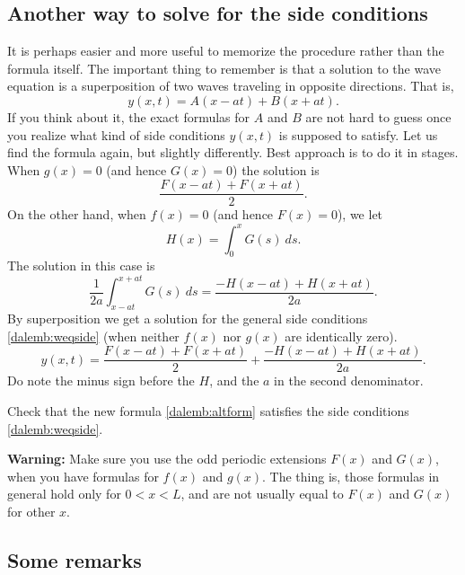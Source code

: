 \subsection{Another way to solve for the side conditions}

It is perhaps easier and more useful
to memorize the procedure rather than the formula
itself.  The important thing to remember is that a solution to the wave
equation is a superposition of two waves traveling in opposite directions.
That is,
\begin{equation*}
y(x,t) = A(x-at) + B(x+at) .
\end{equation*}
If you think about it, the exact formulas for $A$ and $B$ are not hard
to guess once you realize what kind of side conditions $y(x,t)$ is supposed to
satisfy.  Let us find the formula again, but slightly differently.
Best approach is to do it in stages.  When $g(x) = 0$ (and hence
$G(x) = 0$) the solution is
\begin{equation*}
\frac{ F(x-at) + F(x+at) }{2} .
\end{equation*}
On the other hand,
when $f(x) = 0$ (and hence $F(x) = 0$), we let
\begin{equation*}
H(x) = \int_0^x G(s) ~ds .
\end{equation*}
The solution in this case is
\begin{equation*}
\frac{1}{2a} \int_{x-at}^{x+at} G(s) ~ds
=
\frac{ -H(x-at) + H(x+at) }{2a} .
\end{equation*}
By superposition we get a solution for the general side conditions
\eqref{dalemb:weqside} (when neither $f(x)$ nor $g(x)$ are identically zero).
\begin{equation} \label{dalemb:altform}
y(x,t) = \frac{ F(x-at) + F(x+at) }{2} +
\frac{ -H(x-at) + H(x+at) }{2a} .
\end{equation}
Do note the minus sign before the $H$, and the $a$ in the second denominator.

\begin{exercise}
Check that the new formula \eqref{dalemb:altform} satisfies
the side conditions
\eqref{dalemb:weqside}.
\end{exercise}

\textbf{Warning:}
Make sure you use the odd periodic extensions $F(x)$ and $G(x)$,
when you have formulas for $f(x)$ and $g(x)$.
The thing is, those formulas in general hold
only for $0 < x < L$, and are not usually equal to $F(x)$ and $G(x)$
for other $x$.

\subsection{Some remarks}

